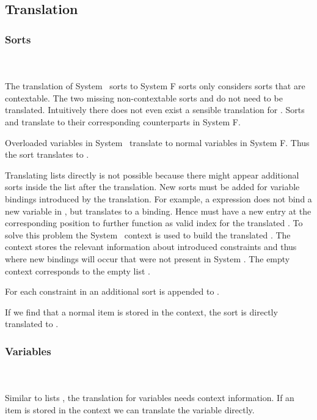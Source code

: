 \subsection{Translation}
\subsubsection{Sorts}\hfill\\\\
The translation of System \Fo\ sorts to System F sorts only considers sorts that are contextable. 
The two missing non-contextable sorts  and  do not need to be translated. 
Intuitively there does not even exist a sensible translation for .
\DPTSort
Sorts  and  translate to their corresponding counterparts in System F. 

\noindent  Overloaded variables in System \Fo\ translate to normal variables in System F. 
Thus the sort  translates to . 

\noindent Translating lists  directly is not possible because there might appear additional sorts inside the list after the translation. 
New sorts must be added for variable bindings introduced by the translation. 
For example, a    \Constr{=}    expression does not bind a new variable in , but translates to a     binding. 
Hence  must have a new entry  at the corresponding position to further function as valid index for the translated . 
To solve this problem the System \Fo\ context  is used to build the translated . 
The context stores the relevant information about introduced constraints and thus where new bindings will occur that were not present in System \Fo. 
\DPTSorts
The empty context  corresponds to the empty list \Constr{[]}.

\noindent For each constraint in  an additional sort  is appended to .

\noindent If we find that a normal item is stored in the context, the sort  is directly translated to  .

\subsubsection{Variables}\hfill\\\\
Similar to lists , the translation for variables  needs context information.  
\DPTVar
If an item is stored in the context we can translate the variable directly. 


